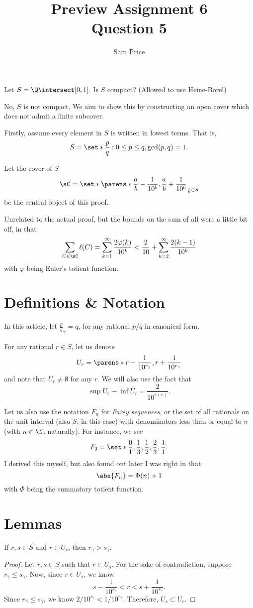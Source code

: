 \documentclass{article}
\author{Sam Price}
\date{}
\title{Preview Assignment 6\\\Large{Question 5}}
\newcommand{\Rt}[1]{\dfrac{1}{10^{#1}}}
\begin{document}
\maketitle

Let $S = \Q \intersect [0, 1]$. Is $S$ compact? (Allowed to use Heine-Borel)
\vspace{0.5cm}

No, $S$ is not compact. We aim to show this by constructing an open cover which does not admit a finite subcover.

Firstly, assume every element in $S$ is written in lowest terms. That is,
\[ S = \set*{\frac{p}{q} : 0 \le p \le q, \gcd(p, q) = 1 }. \]

Let the cover of $S$
\[ \sC = \set*{\parens*{\frac{a}{b} - \Rt{b}, \frac{a}{b} + \Rt{b}}}_{\frac{a}{b} \in S} \]
be the central object of this proof.

Unrelated to the actual proof, but the bounds on the sum of all were a little bit off, in that
\[
  \sum_{C \in \sC} \ell(C) = \sum_{k = 1}^{\infty}\frac{2\varphi(k)}{10^{k}}
  < \frac{2}{10} + \sum_{k = 2}^{\infty}\frac{2(k - 1)}{10^{k}}
\]
with $\varphi$ being Euler's totient function.


\section{Definitions \& Notation}
In this article, let $\frac{p}{q}_{\gamma} = q$, for any rational $p/q$ in canonical form.

For any rational $r \in S$, let us denote
\[ U_{r} = \parens*{r - \Rt{r_{\gamma}}, r + \Rt{r_{\gamma}}} \]
and note that $U_{r} \ne \emptyset$ for any $r$. We will also use the fact that
\[ \sup U_{r} - \inf U_{r} = \frac{2}{10^{\gamma(r)}}. \]

Let us also use the notation $F_{n}$ for \emph{Farey sequences}, or the set of all rationals
on the unit interval (also $S$, in this case) with denominators less than or equal to $n$ (with $n \in \N$, naturally).
For instance, we see
\[ F_{3} = \set*{\frac{0}{1}, \frac{1}{3}, \frac{1}{2}, \frac{2}{3}, \frac{1}{1}}. \]
I derived this myself, but also found out later I was right in that
\[ \abs{F_{n}} = \Phi(n) + 1 \]
with $\Phi$ being the summatory totient function.

\section{Lemmas}

\begin{lem}
  If $r, s \in S$ and $r \in U_{s}$, then $r_{\gamma} > s_{\gamma}$.
\end{lem}
\begin{proof}
  Let $r, s \in S$ such that $r \in U_{s}$. For the sake of contradiction, suppose $r_{\gamma} \le s_{\gamma}$.
  Now, since $r \in U_{s}$, we know
  \[ s - \Rt{s_{\gamma}} < r < s + \Rt{s_{\gamma}}. \]
  Since $r_{\gamma} \le s_{\gamma}$, we know $2/10^{s_{\gamma}} < 1/10^{r_{\gamma}}$. Therefore, $U_{s} \subset U_{r}$.
\end{proof}
\end{document}

